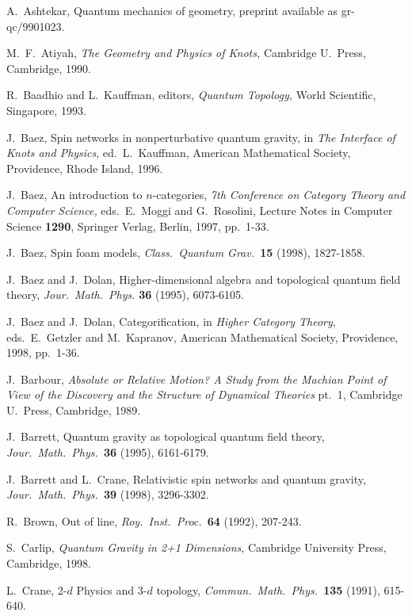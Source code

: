 \begin{thebibliography}{99}

 A.\ Ashtekar, Quantum mechanics of geometry,
preprint available as gr-qc/9901023.

 M.\ F.\ Atiyah, {\sl The Geometry and Physics of
Knots,} Cambridge U.\ Press, Cambridge, 1990.

 R.\ Baadhio and L.\ Kauffman, editors, {\sl Quantum Topology,} 
World Scientific, Singapore, 1993.  

 J.\ Baez, Spin networks in nonperturbative quantum gravity,
in {\sl The Interface of Knots and Physics}, ed.\ L.\ Kauffman, American
Mathematical Society, Providence, Rhode Island, 1996.

 J.\ Baez, An introduction to $n$-categories, {\sl  7th
Conference on Category Theory and Computer Science,} eds.\  E.\ Moggi
and G.\ Rosolini, Lecture Notes in Computer Science {\bf 1290}, Springer
Verlag, Berlin, 1997, pp.\ 1-33.

 J.\ Baez, Spin foam models, {\sl Class.\ Quantum
Grav.\ }{\bf 15} (1998), 1827-1858.

 J.\ Baez and J.\ Dolan, Higher-dimensional algebra
and topological quantum field theory, {\sl Jour.\ Math.\ Phys.} {\bf 36}
(1995), 6073-6105. 

 J.\ Baez and J.\ Dolan, Categorification, in
{\sl Higher Category Theory}, eds.\ E.\ Getzler and M.\ Kapranov, 
American Mathematical Society, Providence, 1998, pp.\ 1-36.

 J.\ Barbour, {\sl Absolute or Relative Motion?  A
Study from the Machian Point of View of the Discovery and the Structure
of Dynamical Theories} pt.\ 1, Cambridge U.\ Press, Cambridge, 1989.

 J.\ Barrett, Quantum gravity as topological quantum field
theory, {\sl Jour.\ Math.\ Phys.\ }{\bf 36} (1995), 6161-6179.

 J.\ Barrett and L.\ Crane, Relativistic spin networks
and quantum gravity, {\sl Jour.\ Math.\ Phys.\ }{\bf 39} (1998), 
3296-3302.

 R.\ Brown, Out of line, {\sl Roy.\ Inst.\ Proc.\ }{\bf 64}
(1992), 207-243.

 S.\ Carlip, {\sl Quantum Gravity in 2+1 Dimensions}, 
Cambridge University Press, Cambridge, 1998.   

 L.\ Crane, 2-$d$ Physics and 3-$d$ topology, 
{\sl Commun.\ Math.\ Phys.\ }{\bf 135} (1991), 615-640.


\end{thebibliography}
